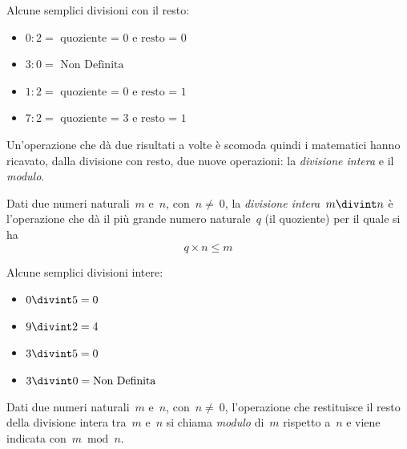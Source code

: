  \begin{esempio}
 Alcune semplici divisioni con il resto:
 \vspace{-1em}
\begin{multicols}{2}
\begin{itemize} [nosep]
\item \(0:2 = \text{ quoziente~=~0 e resto~=~0}\)
\item \(3:0 = \text{ Non Definita}\)
\item \(1:2 = \text{ quoziente~=~0 e resto~=~1}\)
\item \(7:2 = \text{ quoziente~=~3 e resto~=~1}\)
\end{itemize}
\end{multicols}
\end{esempio}

Un'operazione che dà due risultati a volte è scomoda quindi i matematici 
hanno ricavato, dalla divisione con resto, due nuove operazioni: 
la \emph{divisione intera} e il \emph{modulo}.

\begin{definizione}
Dati due numeri naturali~\(m\) e~\(n\), con~\(n\neq~0\), la 
\emph{divisione intera}~\(m\divint n\) è l'operazione che dà il più grande 
numero naturale~\(q\) (il quoziente) per il quale si ha
\[q\times n\le m\]
\end{definizione}

\begin{esempio}
Alcune semplici divisioni intere:
\vspace{-1em}
\begin{multicols}{2}
\begin{itemize} [nosep]
\item \(0 \divint 5=0\)
\item \(9 \divint 2=4\)
\item \(3 \divint 5=0\)
\item \(3 \divint 0=\text{Non Definita}\)
\end{itemize}
\end{multicols}
\end{esempio}

\begin{definizione}
Dati due numeri naturali~\(m\) e~\(n\), con~\(n\neq~0\), l'operazione che 
restituisce il resto della divisione intera tra~\(m\) e~\(n\) si chiama 
\emph{modulo} di~\(m\) rispetto a~\(n\) e viene indicata con~\(m\bmod{n}\).
\end{definizione}


